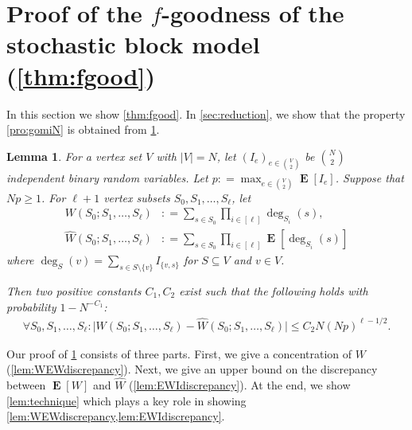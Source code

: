 \documentclass[letterpaper,11pt]{article}
\newtheorem{lemma}[theorem]{Lemma}
\newcommand{\W}{W}
\newcommand{\Wh}{\hat{W}}
\newcommand{\Ind}{I}
\newcommand{\Vsize}{N}
\newcommand{\pmax}{p}
\DeclareMathOperator{\E}{\mathbf{E}}
\def\defeq{\mathrel{\mathop:}=}%
\begin{document}
\section[Proof of f-goodness]{Proof of the $f$-goodness of the stochastic block model (\cref{thm:fgood})}\label{sec:randomgraphs}
In this section we show \cref{thm:fgood}. %
In \cref{sec:reduction}, we show that the property \ref{pro:gomiN} is obtained from \cref{lem:WIdiscrepancy}.
%
\begin{lemma}
\label{lem:WIdiscrepancy}
For a vertex set $V$ with $|V|=\Vsize$, let $(\Ind_e)_{e\in \binom{V}{2}}$ be $\binom{N}{2}$ independent binary random variables. 
Let $\pmax \defeq \max_{e\in \binom{V}{2}}\E[\Ind_e]$.
Suppose that $\Vsize \pmax \geq 1$.
For $\ell+1$ vertex subsets $S_0, S_1, \ldots, S_\ell$, let
\begin{align*}
\W(S_0;S_1,\ldots,S_\ell)&\defeq\sum_{s\in S_0}\prod_{i\in[\ell]}\deg_{S_i}(s), 
\\
\Wh(S_0;S_1,\ldots,S_\ell)&\defeq \sum_{s\in S_0}\prod_{i\in[\ell]}\E[\deg_{S_i}(s)]
\end{align*}
where $\deg_S(v)=\sum_{s\in S\setminus \{v\}}\Ind_{\{v,s\}}$ for $S\subseteq V$ and $v\in V$.

Then two positive constants $C_1, C_2$ exist such that the following holds with probability $1-\Vsize^{-C_1}$: 
\begin{align*}
\forall S_0, S_1, \ldots, S_\ell: \bigl|\W(S_0;S_1,\ldots,S_\ell)-\Wh(S_0;S_1,\ldots,S_\ell)\bigr| 
\leq C_2\Vsize (\Vsize \pmax)^{\ell-1/2}.
\end{align*}
\end{lemma}


Our proof of \cref{lem:WIdiscrepancy} consists of three parts.
First, we give a concentration of $W$ (\cref{lem:WEWdiscrepancy}). %
Next, we give an upper bound on the discrepancy between $\E[W]$ and $\Wh$ (\cref{lem:EWIdiscrepancy}). %
At the end, we show \cref{lem:technique} which plays a key role in showing \cref{lem:WEWdiscrepancy,lem:EWIdiscrepancy}. %
\end{document}
